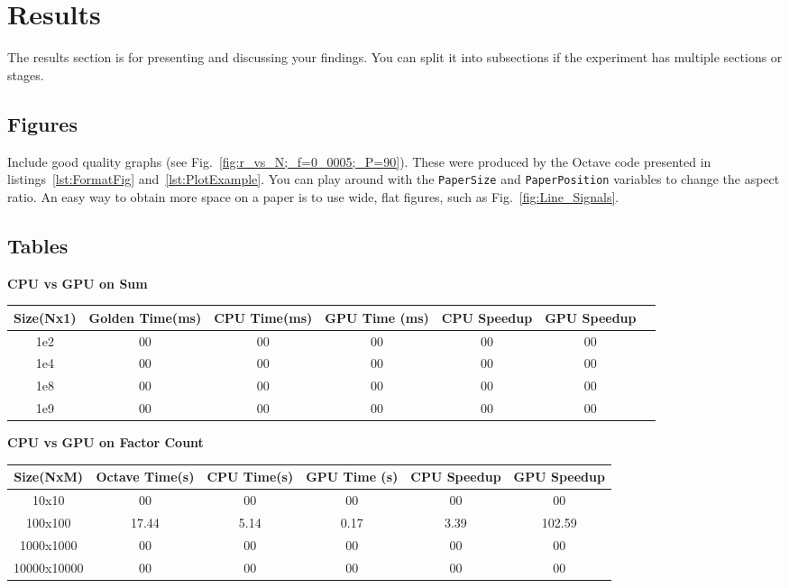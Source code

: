 \section{Results}
The results section is for presenting and discussing your findings.  You can split it into subsections if the experiment has multiple sections or stages.

\subsection{Figures}
Include good quality graphs (see Fig.~\ref{fig:r_vs_N;_f=0_0005;_P=90}).  These were produced by the Octave code presented in listings~\ref{lst:FormatFig} and~\ref{lst:PlotExample}.  You can play around with the \texttt{PaperSize} and \texttt{PaperPosition} variables to change the aspect ratio.  An easy way to obtain more space on a paper is to use wide, flat figures, such as Fig.~\ref{fig:Line_Signals}.




\subsection{Tables}

\centering \textbf{CPU vs GPU on Sum}\\
\begin{table}[h!]
	\centering
	\begin{tabular}{c c c c c c c} 
		\hline\hline
		 Size(Nx1) & Golden Time(ms) & CPU Time(ms) & GPU Time (ms) & CPU Speedup &GPU Speedup\\ [0.5ex] 
		\hline
		1e2 & 00 & 00 & 00 & 00 & 00\\ [1ex] 
		1e4 & 00 & 00 & 00 & 00 & 00\\ [1ex] 
		1e8 & 00 & 00 & 00 & 00 & 00\\ [1ex] 
		1e9 & 00 & 00 & 00 & 00 & 00\\ [1ex] 
		\hline\hline
	\end{tabular}	
\end{table}

\centering \textbf{CPU vs GPU on Factor Count}\\
\begin{table}[h!]
	\centering
	\begin{tabular}{c c c c c c } 
		\hline\hline
		Size(NxM) & Octave Time(s) & CPU Time(s) & GPU Time (s) & CPU Speedup &GPU Speedup\\ [0.5ex] 
		\hline
		10x10 & 00 & 00 & 00 & 00 & 00\\ [1ex] 
		100x100 & 17.44 & 5.14 & 0.17 & 3.39 & 102.59\\ [1ex] 
		1000x1000 & 00 & 00 & 00 & 00 & 00 \\ [1ex] 
		10000x10000 & 00 & 00 & 00 & 00 & 00\\ [1ex] 
		\hline\hline
	\end{tabular}	
\end{table}


